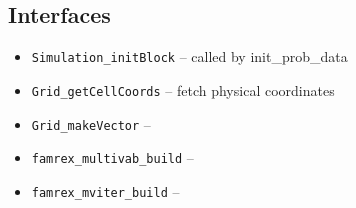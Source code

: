 \documentclass{article}
\newcommand{\code}[1]{{\tt#1}}
\begin{document}
\subsection{Interfaces}
\label{sec:flash-interfaces}
\begin{itemize}
\item \code{Simulation\_initBlock} -- called by init\_prob\_data
\item \code{Grid\_getCellCoords} -- fetch physical coordinates 
\item \code{Grid\_makeVector} --
\item \code{famrex\_multivab\_build} --
\item \code{famrex\_mviter\_build} -- 

\end{itemize}
\end{document}
